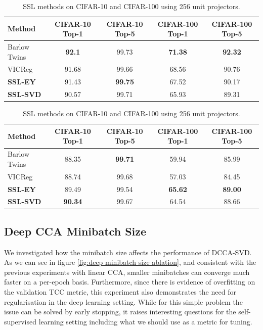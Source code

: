 \begin{table}[h] 
\centering 
\begin{tabular}{lcccc} 
\hline 
Method & CIFAR-10 Top-1 & CIFAR-10 Top-5 & CIFAR-100 Top-1 & CIFAR-100 Top-5 \\ 
\hline 
Barlow Twins & \textbf{92.1} & 99.73 & \textbf{71.38} & \textbf{92.32}\\
VICReg & 91.68	&99.66 & 68.56&	90.76 \\
\textbf{SSL-EY} & 91.43& \textbf{99.75}& 67.52& 90.17\\
\textbf{SSL-SVD} & 90.57 & 99.71 & 65.93 & 89.31 \\
\hline 
\end{tabular} \caption{SSL methods on CIFAR-10 and CIFAR-100 using 2048 unit projectors.} \label{tab:selfsup}
\centering 
\begin{tabular}{lcccc} 
\hline 
Method & CIFAR-10 Top-1 & CIFAR-10 Top-5 & CIFAR-100 Top-1 & CIFAR-100 Top-5 \\ 
\hline 
Barlow Twins & 88.35 & \textbf{99.71} & 59.94 & 85.99 \\
VICReg & 88.74 & 99.68 & 57.03& 84.45 \\
\textbf{SSL-EY} & 89.49 & 99.54 & \textbf{65.62}& \textbf{89.00}\\
\textbf{SSL-SVD} & \textbf{90.34} & 99.67 & 64.54 & 88.66 \\
\hline 
\end{tabular} \caption{SSL methods on CIFAR-10 and CIFAR-100 using 256 unit projectors.} \label{tab:selfsupsmaller} \end{table}


\subsection{Deep CCA Minibatch Size}

We investigated how the minibatch size affects the performance of DCCA-SVD. As we can see in figure \ref{fig:deep minibatch size ablation}, and consistent with the previous experiments with linear CCA, smaller minibatches can converge much faster on a per-epoch basis. Furthermore, since there is evidence of overfitting on the validation TCC metric, this experiment also demonstrates the need for regularisation in the deep learning setting.  While for this simple problem the issue can be solved by early stopping, it raises interesting questions for the self-supervised learning setting including what we should use as a metric for tuning.


